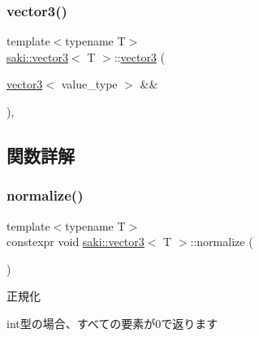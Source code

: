 \mbox{\label{classsaki_1_1vector3_a50a48aa79b10d3cdcfcd9a0a0a5801e5}} 
\subsubsection{\texorpdfstring{vector3()}{vector3()}\hspace{0.1cm}{\footnotesize\ttfamily [5/5]}}
{\footnotesize\ttfamily template$<$typename T$>$ \\
\mbox{\hyperlink{classsaki_1_1vector3}{saki\+::vector3}}$<$ T $>$\+::\mbox{\hyperlink{classsaki_1_1vector3}{vector3}} (\begin{DoxyParamCaption}\item[{\mbox{\hyperlink{classsaki_1_1vector3}{vector3}}$<$ value\+\_\+type $>$ \&\&}]{ }\end{DoxyParamCaption})\hspace{0.3cm}{\ttfamily [default]}, {\ttfamily [noexcept]}}



\subsection{関数詳解}
\mbox{\label{classsaki_1_1vector3_af99372de14e9ddba3eba28327c555930}} 
\subsubsection{\texorpdfstring{normalize()}{normalize()}}
{\footnotesize\ttfamily template$<$typename T$>$ \\
constexpr void \mbox{\hyperlink{classsaki_1_1vector3}{saki\+::vector3}}$<$ T $>$\+::normalize (\begin{DoxyParamCaption}{ }\end{DoxyParamCaption})\hspace{0.3cm}{\ttfamily [inline]}}



正規化 

int型の場合、すべての要素が0で返ります \mbox{\label{classsaki_1_1vector3_a4318c169c217b1b35b3d79ee53d767f5}} 
